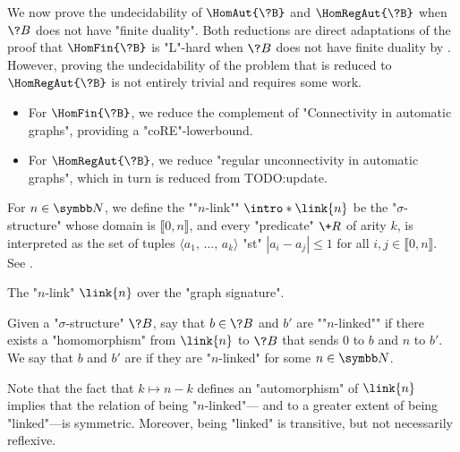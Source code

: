 We now prove the undecidability of $\HomAut{\?B}$ and $\HomRegAut{\?B}$
when $\?B$ does not have "finite duality". Both reductions are
direct adaptations of the proof that $\HomFin{\?B}$ is "L"-hard when $\?B$ does not
have finite duality by \textcite[Theorem 3.2]{LaroseTesson2009UniversalAlgebraCSP}.
However, proving the undecidability of the problem that is reduced
to $\HomRegAut{\?B}$ is not entirely trivial and requires some work.
\begin{itemize}
	\item For $\HomFin{\?B}$, we reduce the complement of "Connectivity in automatic graphs",
		providing a "coRE"-lowerbound.
	\item For $\HomRegAut{\?B}$, we reduce "regular unconnectivity in automatic graphs",
		which in turn is reduced from  TODO:update.
\end{itemize}

For $n\in\N$, we define the \AP""$n$-link"" $\intro*\link{n}$ be the "$\sigma$-structure" 
whose domain is $\lBrack 0,n\rBrack$, and every "predicate" $\+R$
of arity $k$, is interpreted as the set of tuples $\langle a_1,\, \hdots,\, a_k \rangle$
"st" $|a_i-a_j| \leq 1$ for all $i,j \in \lBrack 0,n \rBrack$. See .
\begin{marginfigure}
	\centering
	\begin{tikzpicture}
		
	\end{tikzpicture}
	\caption{\AP\label{fig:n-link}The "$n$-link" $\link{n}$ over the "graph signature".}
\end{marginfigure}
Given a "$\sigma$-structure" $\?B$, say that $b \in \?B$ and $b'$ are
\AP""$n$-linked"" if there exists a "homomorphism" from $\link{n}$ to $\?B$
that sends $0$ to $b$ and $n$ to $b'$. We say that $b$ and $b'$ are \AP{} if
they are "$n$-linked" for some $n \in \N$.

Note that the fact that $k \mapsto n-k$
defines an "automorphism" of $\link{n}$ implies that the relation of being "$n$-linked"---%
and to a greater extent of being "linked"---is symmetric.
Moreover, being "linked" is transitive, but not necessarily reflexive.


